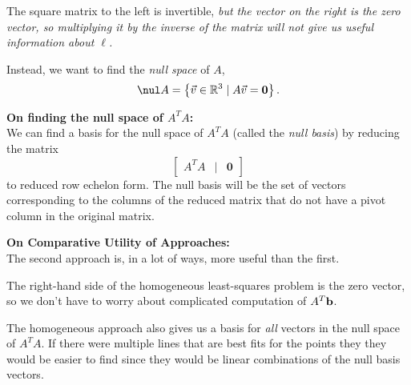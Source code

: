 \begin{problem}
\begin{enumroman}
\begin{answer}
        The square matrix to the left is invertible,
        \emph{
          but the vector on the right is the zero vector,
          so multiplying it by the inverse of the matrix
          will not give us useful information about $\ell$.
        }

        Instead, we want to find the \emph{null space} of $A$,
        \[ \nul A = \set{\vec{v} \in \R^3 \mid A \vec{v} = \mathbf{0}}. \]

        \textbf{On finding the null space of $A^TA$:} \\
        We can find a basis for the null space of $A^TA$
        (called the \emph{null basis}) by reducing the matrix
        \[ \begin{bmatrix}
          A^TA & | & \mathbf{0}
        \end{bmatrix}
        \] to reduced row echelon form.
        The null basis will be the set of vectors corresponding
        to the columns of the reduced matrix that do not have
        a pivot column in the original matrix.

        \step
        \textbf{On Comparative Utility of Approaches:}\\
        The second approach is, in a lot of ways, more useful than the first.
        
        \begin{enumarabic}
          \item The right-hand side of the homogeneous least-squares
            problem is the zero vector, so we don't have to worry about
            complicated computation of $A^T \mathbf{b}$.

          \item The homogeneous approach also gives us a basis for \emph{all}
            vectors in the null space of $A^TA$.
            If there were multiple lines that are best fits for the points
            they they would be easier to find since they would be linear
            combinations of the null basis vectors.
        \end{enumarabic}
      \end{answer}
  \end{enumroman}
\end{problem}
